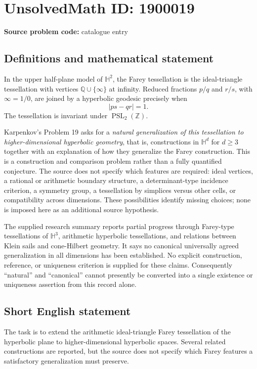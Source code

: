 \documentclass[11pt]{article}
\newcommand{\Z}{\mathbb{Z}}
\newcommand{\Q}{\mathbb{Q}}
\begin{document}
\section*{UnsolvedMath ID: 1900019}
\textbf{Source problem code:} catalogue entry
\subsection{Definitions and mathematical statement}
In the upper half-plane model of $\mathbb H^2$, the Farey tessellation is the ideal-triangle tessellation with vertices $\Q\cup\{\infty\}$ at infinity. Reduced fractions $p/q$ and $r/s$, with $\infty=1/0$, are joined by a hyperbolic geodesic precisely when
\[
|ps-qr|=1.
\]
The tessellation is invariant under $\operatorname{PSL}_2(\Z)$.

Karpenkov's Problem 19 asks for a \emph{natural generalization of this tessellation to higher-dimensional hyperbolic geometry}, that is, constructions in $\mathbb H^d$ for $d\geq3$ together with an explanation of how they generalize the Farey construction. This is a construction and comparison problem rather than a fully quantified conjecture. The source does not specify which features are required: ideal vertices, a rational or arithmetic boundary structure, a determinant-type incidence criterion, a symmetry group, a tessellation by simplices versus other cells, or compatibility across dimensions. These possibilities identify missing choices; none is imposed here as an additional source hypothesis.

The supplied research summary reports partial progress through Farey-type tessellations of $\mathbb H^3$, arithmetic hyperbolic tessellations, and relations between Klein sails and cone-Hilbert geometry. It says no canonical universally agreed generalization in all dimensions has been established. No explicit construction, reference, or uniqueness criterion is supplied for these claims. Consequently ``natural'' and ``canonical'' cannot presently be converted into a single existence or uniqueness assertion from this record alone.
\subsection{Short English statement}
The task is to extend the arithmetic ideal-triangle Farey tessellation of the hyperbolic plane to higher-dimensional hyperbolic spaces. Several related constructions are reported, but the source does not specify which Farey features a satisfactory generalization must preserve.
\end{document}
